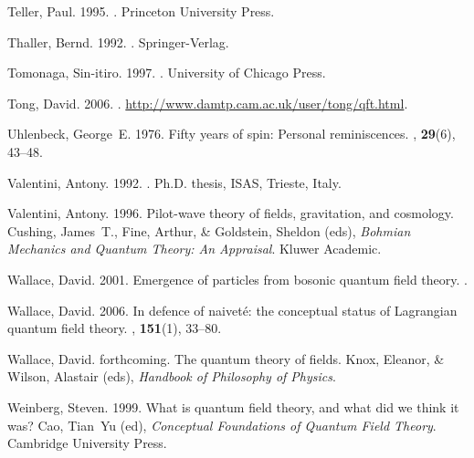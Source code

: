 \documentclass[onecolumn,secnumarabic,amsmath,amssymb,balancelastpage,nofootinbib]{article}
\begin{document}
\begin{thebibliography}{}
Teller, Paul. 1995.
.
\newblock Princeton University Press.

Thaller, Bernd. 1992.
.
\newblock Springer-Verlag.

Tomonaga, Sin-itiro. 1997.
.
\newblock University of Chicago Press.

Tong, David. 2006.
.
\newblock \url{http://www.damtp.cam.ac.uk/user/tong/qft.html}.

Uhlenbeck, George~E. 1976.
\newblock Fifty years of spin: Personal reminiscences.
, {\bf 29}(6), 43--48.

Valentini, Antony. 1992.
.
\newblock Ph.D. thesis, ISAS, Trieste, Italy.

Valentini, Antony. 1996.
\newblock Pilot-wave theory of fields, gravitation, and cosmology.
 Cushing, James~T., Fine, Arthur, \&
  Goldstein, Sheldon (eds), {\em Bohmian Mechanics and Quantum Theory: An
  Appraisal}.
\newblock Kluwer Academic.

Wallace, David. 2001.
\newblock Emergence of particles from bosonic quantum field theory.
.

Wallace, David. 2006.
\newblock In defence of naivet\'{e}: the conceptual status of Lagrangian
  quantum field theory.
, {\bf 151}(1), 33--80.

Wallace, David. forthcoming.
\newblock The quantum theory of fields.
 Knox, Eleanor, \& Wilson, Alastair (eds), {\em Handbook of
  Philosophy of Physics}.

Weinberg, Steven. 1999.
\newblock What is quantum field theory, and what did we think it was?
 Cao, Tian~Yu (ed), {\em Conceptual
  Foundations of Quantum Field Theory}.
\newblock Cambridge University Press.


\end{thebibliography}
\end{document}
